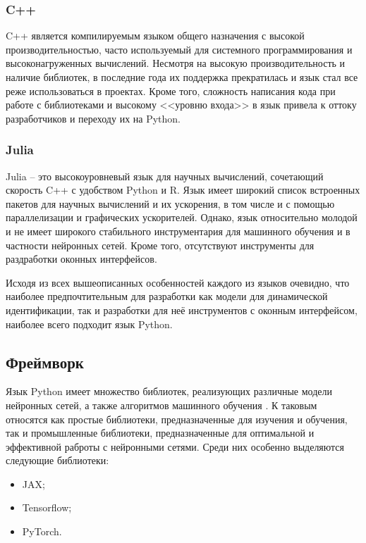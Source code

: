 \subsubsection{C++} 
C++ является компилируемым языком общего назначения с высокой
производительностью, часто используемый для системного программирования и
высоконагруженных вычислений. Несмотря на высокую производительность и наличие
библиотек, в последние года их поддержка прекратилась и язык стал все реже
использоваться в проектах. Кроме того, сложность написания кода при работе с
библиотеками и высокому <<уровню входа>> в язык привела к оттоку разработчиков и
переходу их на Python.

\subsubsection{Julia} 
Julia – это высокоуровневый язык для научных вычислений, сочетающий скорость C++
с удобством Python и R. Язык имеет широкий список встроенных пакетов для научных
вычислений и их ускорения, в том числе и с помощью параллелизации и графических
ускорителей. Однако, язык относительно молодой и не имеет широкого стабильного
инструментария для машинного обучения и в частности нейронных сетей. Кроме того,
отсутствуют инструменты для раздработки оконных интерфейсов. 

Исходя из всех вышеописанных особенностей каждого из языков очевидно, что
наиболее предпочтительным для разработки как модели для динамической
идентификации, так и разработки для неё инструментов с оконным интерфейсом,
наиболее всего подходит язык Python.

\subsection{Фреймворк}

Язык Python имеет множество библиотек, реализующих различные модели нейронных
сетей, а также алгоритмов машинного обучения \cite{bib:tools:simulation}. К
таковым относятся как простые библиотеки, предназначенные для изучения и
обучения, так и промышленные библиотеки, предназначенные для оптимальной и
эффективной раброты с нейронными сетями. Среди них особенно выделяются следующие
библиотеки:

\begin{itemize}
  \item JAX;
  \item Tensorflow;
  \item PyTorch. 
\end{itemize}

